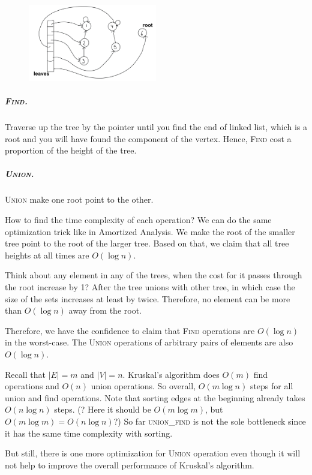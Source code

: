 \begin{figure}[H]
	\centering
	\includegraphics[width=0.5\textwidth]{attemp-2.png}
\end{figure}

\subparagraph{\textsc{Find}.} Traverse up the tree by the pointer until you find the end of linked list, which is a root and you will have found the component of the vertex. Hence, \textsc{Find} cost a proportion of the height of the tree. 

\subparagraph{\textsc{Union}.} \textsc{Union} make one root point to the other. 

How to find the time complexity of each operation? We can do the same optimization trick like in Amortized Analysis. We make the root of the smaller tree point to the root of the larger tree. Based on that, we claim that all tree heights at all times are $ O(\log n) $.
\begin{claimproof}
	Think about any element in any of the trees, when the cost for it passes through the root increase by 1? After the tree unions with other tree, in which case the size of the sets increases at least by twice. Therefore, no element can be more than $O(\log n)$ away from the root.
\end{claimproof}

Therefore, we have the confidence to claim that \textsc{Find} operations are $ O(\log n) $ in the worst-case. The \textsc{Union} operations of arbitrary pairs of elements are also $ O(\log n) $.

Recall that $|E| = m$ and $|V| = n$. Kruskal's algorithm does $O(m)$ find operations and $O(n)$ union operations. So overall, $O(m \log n)$ steps for all union and find operations. Note that sorting edges at the beginning already takes $O(n\log n)$ steps. (? Here it should be $O(m\log m)$, but $O(m\log m) = O(n\log n)$?) So far \textsc{union\_find} is not the sole bottleneck since it has the same time complexity with sorting. 

But still, there is one more optimization for \textsc{Union} operation even though it will not help to improve the overall performance of Kruskal's algorithm.


